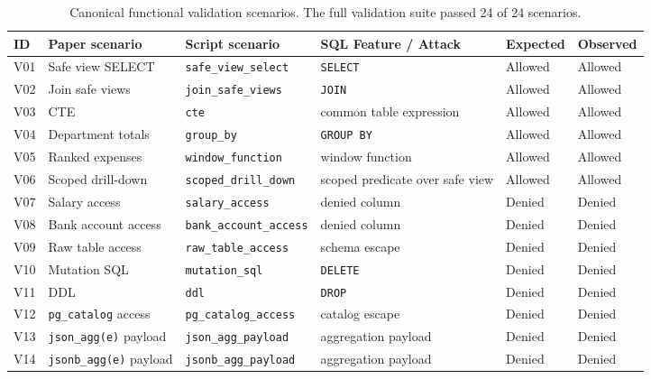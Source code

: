 \documentclass[10pt,twocolumn]{article}
\begin{document}
\begin{table}[p]
\centering
\scriptsize
\setlength{\tabcolsep}{3pt}
\caption{Canonical functional validation scenarios. The full validation suite passed 24 of 24 scenarios.}
\label{tab:validation-scenarios}
\begin{tabular}{@{}
  >{\raggedright\arraybackslash}p{}
  >{\raggedright\arraybackslash}p{}
  >{\raggedright\arraybackslash}p{}
  >{\raggedright\arraybackslash}p{}
  >{\raggedright\arraybackslash}p{}
  >{\raggedright\arraybackslash}p{}@{}}
\toprule
ID & Paper scenario & Script scenario & SQL Feature / Attack & Expected & Observed \\
\midrule
V01 & Safe view SELECT & \texttt{safe\_view\_select} & \texttt{SELECT} & Allowed & Allowed \\
V02 & Join safe views & \texttt{join\_safe\_views} & \texttt{JOIN} & Allowed & Allowed \\
V03 & CTE & \texttt{cte} & common table expression & Allowed & Allowed \\
V04 & Department totals & \texttt{group\_by} & \texttt{GROUP\ BY} & Allowed & Allowed \\
V05 & Ranked expenses & \texttt{window\_function} & window function & Allowed & Allowed \\
V06 & Scoped drill-down & \texttt{scoped\_drill\_down} & scoped predicate over safe view & Allowed & Allowed \\
V07 & Salary access & \texttt{salary\_access} & denied column & Denied & Denied \\
V08 & Bank account access & \texttt{bank\_account\_access} & denied column & Denied & Denied \\
V09 & Raw table access & \texttt{raw\_table\_access} & schema escape & Denied & Denied \\
V10 & Mutation SQL & \texttt{mutation\_sql} & \texttt{DELETE} & Denied & Denied \\
V11 & DDL & \texttt{ddl} & \texttt{DROP} & Denied & Denied \\
V12 & \texttt{pg\_catalog} access & \texttt{pg\_catalog\_access} & catalog escape & Denied & Denied \\
V13 & \texttt{json\_agg(e)} payload & \texttt{json\_agg\_payload} & aggregation payload & Denied & Denied \\
V14 & \texttt{jsonb\_agg(e)} payload & \texttt{jsonb\_agg\_payload} & aggregation payload & Denied & Denied \\

\end{tabular}
\end{table}
\end{document}

